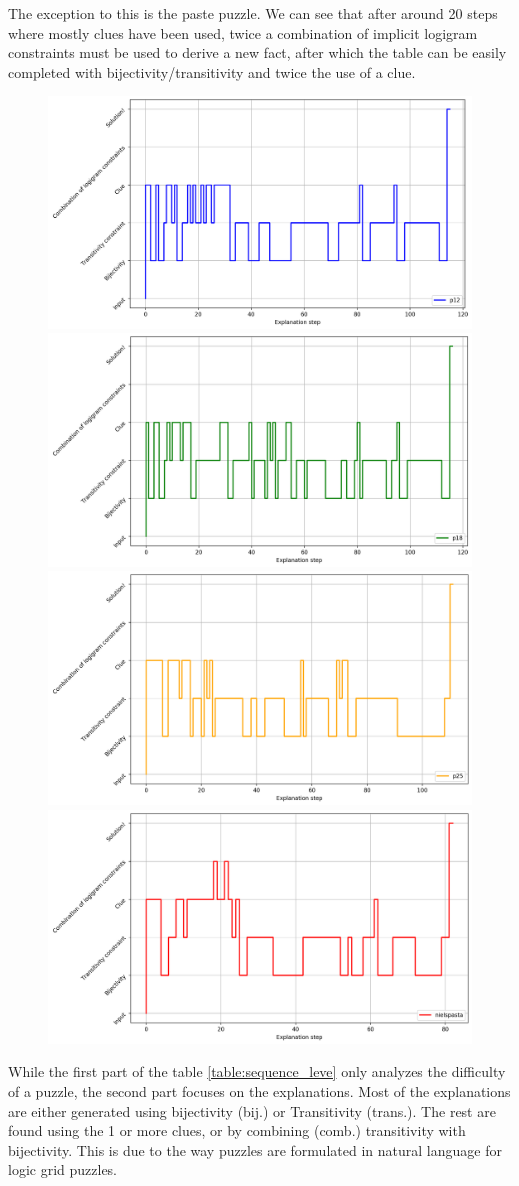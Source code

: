 The exception to this is the paste puzzle. We can see that after around 20 steps where mostly clues have been used, twice a combination of implicit logigram constraints must be used to derive a new fact, after which the table can be easily completed with bijectivity/transitivity and twice the use of a clue.

\begin{figure}
\centering
\includegraphics[width=0.49\linewidth]{figures/plot_cost_steps_p12}
\includegraphics[width=0.49\linewidth]{figures/plot_cost_steps_p18}
\includegraphics[width=0.49\linewidth]{figures/plot_cost_steps_p25}
\includegraphics[width=0.49\linewidth]{figures/plot_cost_steps_nielspasta}
\caption{}
\label{fig:plotcoststepsp12}
\end{figure}



While the first part of the table \ref{table:sequence_leve} only analyzes the difficulty of a puzzle, the second part focuses on the explanations. 
Most of the explanations are either generated using bijectivity (bij.) or Transitivity (trans.). The rest are found using the 1 or more clues, or by combining (comb.) transitivity with bijectivity. This is due to the way puzzles are formulated in natural language for logic grid puzzles.

